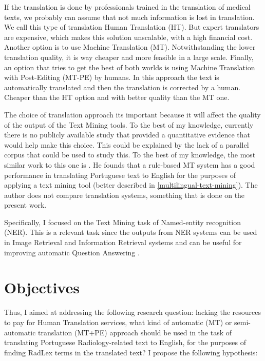 If the translation is done by professionals trained in the translation of medical texts, we probably can assume that not much information is lost in translation. We call this type of translation Human Translation (HT). But expert translators are expensive, which makes this solution unscalable, with a high financial cost. Another option is to use Machine Translation (MT). Notwithstanding the lower translation quality, it is way cheaper and more feasible in a large scale. Finally, an option that tries to get the best of both worlds is using Machine Translation with Post-Editing (MT-PE) by humans. In this approach the text is automatically translated and then the translation is corrected by a human. Cheaper than the HT option and with better quality than the MT one.

The choice of translation approach its important because it will affect the quality of the output of the Text Mining tools. To the best of my knowledge, currently there is no publicly available study that provided a quantitative evidence that would help make this choice. This could be explained by the lack of a parallel corpus that could be used to study this. To the best of my knowledge, the most similar work to this one is \citep{Castilla2007a}. He founds that a rule-based MT system has a good performance in translating Portuguese text to English for the purposes of applying a text mining tool (better described in \ref{multilingual-text-mining}). The author does not compare translation systems, something that is done on the present work.

Specifically, I focused on the Text Mining task of Named-entity recognition (NER). This is a relevant task since the outputs from NER systems can be used in Image Retrieval \citep{Gerstmair2012} and Information Retrieval \citep{Antony2015} systems and can be useful for improving automatic Question Answering \citep{Toral2005}.

\section{Objectives}

Thus, I aimed at addressing the following research question: lacking the resources to pay for Human Translation services, what kind of automatic (MT) or semi-automatic translation (MT+PE) approach should be used in the task of translating Portuguese Radiology-related text to English, for the purposes of finding RadLex terms in the translated text? I propose the following hypothesis:

